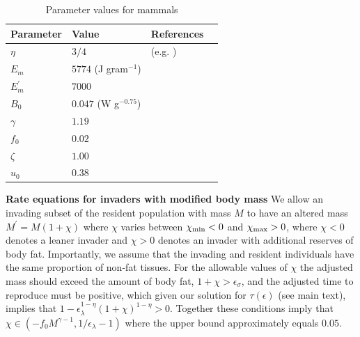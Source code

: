 \documentclass[twocolumn,preprintnumbers,amsmath,amssymb,superscriptaddress]{revtex4}
\begin{document}
\begin{bibunit}[unsrt]


 \begin{table}[h]
\caption{Parameter values for mammals}
\label{param}
    \begin{center}
    \small
     \begin{tabular}{ p{1.2cm} p{3.2cm} l p{2.2cm}|}
     \hline
     Parameter & Value & References  \\
     \hline
   $\eta$ & $3/4$  &  (e.g. \citep{West:2001bv,moses2008rmo,hou}) \\
   $E_{m}$ & $5774$ (J gram$^{-1}$)  &  \citep{moses2008rmo,West:2001bv,hou} \\
   $E_{m}^{\prime}$ & $7000$  & \citep{stryer,hou} \\
   $B_{0}$ & $0.047$ (W g$^{-0.75}$)    & \citep{hou}  \\
   $\gamma$ & $1.19$ & \citep{Lindstedt:1985hm} \\
   $f_{0}$ & $0.02$ & \citep{Lindstedt:1985hm}\\
   $\zeta$ & $1.00$  & \citep{Lindstedt:2002td} \\
   $u_{0}$ & $0.38$  & \citep{Lindstedt:2002td} \\

   \hline
    \end{tabular}
    \end{center}
   \end{table}


{\bf Rate equations for invaders with modified body mass}
We allow an invading subset of the resident population with mass $M$ to have an altered mass $M^\prime = M(1+\chi)$ where $\chi$ varies between $\chi_{\rm min} <0$ and $\chi_{\rm max}>0$, where $\chi<0$ denotes a leaner invader and $\chi > 0$ denotes an invader with additional reserves of body fat.
Importantly, we assume that the invading and resident individuals have the same proportion of non-fat tissues.
For the allowable values of $\chi$ the adjusted mass should exceed the amount of body fat, $1+\chi>\epsilon_{\sigma}$, and the adjusted time to reproduce must be positive, which given our solution for $\tau(\epsilon)$ (see main text), implies that $1-\epsilon_{\lambda}^{1-\eta}\left(1+\chi\right)^{1-\eta}>0$.
Together these conditions imply that  $\chi\in(-f_0M^{\gamma-1},1/\epsilon_{\lambda}-1)$ where the upper bound approximately equals $0.05$.


\end{bibunit}
\end{document}
